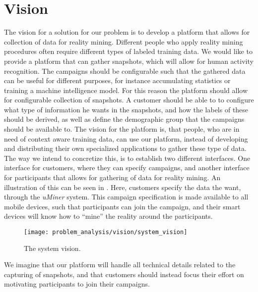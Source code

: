 \section{Vision}
\label{sec:vision}
The vision for a solution for our problem is to develop a platform that allows for collection of data for reality mining. Different people who apply reality mining procedures often require different types of labeled training data. We would like to provide a platform that can gather snapshots, which will allow for human activity recognition. The campaigns should be configurable such that the gathered data can be useful for different purposes, for instance accumulating statistics or training a machine intelligence model. For this reason the platform should allow for configurable collection of snapshots. A customer should be able to to configure what type of information he wants in the snapshots, and how the labels of these should be derived, as well as define the demographic group that the campaigns should be available to. The vision for the platform is, that people, who are in need of context aware training data, can use our platform, instead of developing and distributing their own specialized applications to gather these type of data. The way we intend to concretize this, is to establish two different interfaces. One interface for customers, where they can specify campaigns, and another interface for participants that allows for gathering of data for reality mining. An illustration of this can be seen in . Here, customers specify the data the want, through the \emph{uMiner} system. This campaign specification is made available to all mobile devices, such that participants can join the campaign, and their smart devices will know how to ``mine'' the reality around the participants. 

\begin{figure}[!htbp]
    \centering
    \texttt{[image: problem\_analysis/vision/system\_vision]}
    \caption{The system vision.}
    \label{fig:system_vision}
\end{figure}
\FloatBarrier

We imagine that our platform will handle all technical details related to the capturing of snapshots, and that customers should instead focus their effort on motivating participants to join their campaigns. 

